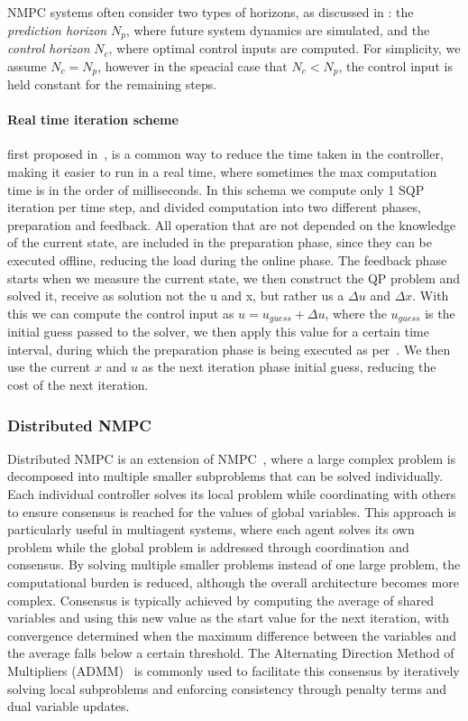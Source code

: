 NMPC systems often consider two types of horizons, as discussed in \cite{schwenzer2021review}: the \textit{prediction horizon} \( N_p \), where future system dynamics are simulated, and the \textit{control horizon} \( N_c \), where optimal control inputs are computed. For simplicity, we assume \( N_c = N_p \), however in the speacial case that \( N_c < N_p \), the control input is held constant for the remaining steps.

\paragraph{Real time iteration scheme} first proposed in~\cite{diehl2002real}, is a common way to reduce the time taken in the controller, making it easier to run in a real time, where sometimes the max computation time is in the order of milliseconds. In this schema we compute only 1 SQP iteration per time step, and divided computation into two different phases, preparation and feedback. All operation that are not depended on the knowledge of the current state, are included in the preparation phase, since they can be executed offline, reducing the load during the online phase. The feedback phase starts when we measure the current state, we then construct the QP problem and solved it, receive as solution not the u and x, but rather us a $\Delta u$ and $\Delta x$. With this we can compute the control input as $u = u_{guess} + \Delta u$, where the $u_{guess}$ is the initial guess passed to the solver, we then apply this value for a certain time interval, during which the preparation phase is being executed as per~\cite{diehl2005real}. We then use the current $x$ and $u$ as the next iteration phase initial guess, reducing the cost of the next iteration. 

\subsubsection{Distributed NMPC}

Distributed NMPC is an extension of NMPC~\cite{muller2013distributed}, where a large complex problem is decomposed into multiple smaller subproblems that can be solved individually. Each individual controller solves its local problem while coordinating with others to ensure consensus is reached for the values of global variables. This approach is particularly useful in multiagent systems, where each agent solves its own problem while the global problem is addressed through coordination and consensus. By solving multiple smaller problems instead of one large problem, the computational burden is reduced, although the overall architecture becomes more complex. Consensus is typically achieved by computing the average of shared variables and using this new value as the start value for the next iteration, with convergence determined when the maximum difference between the variables and the average falls below a certain threshold. The Alternating Direction Method of Multipliers (ADMM)~\cite{boyd2011distributed} is commonly used to facilitate this consensus by iteratively solving local subproblems and enforcing consistency through penalty terms and dual variable updates.